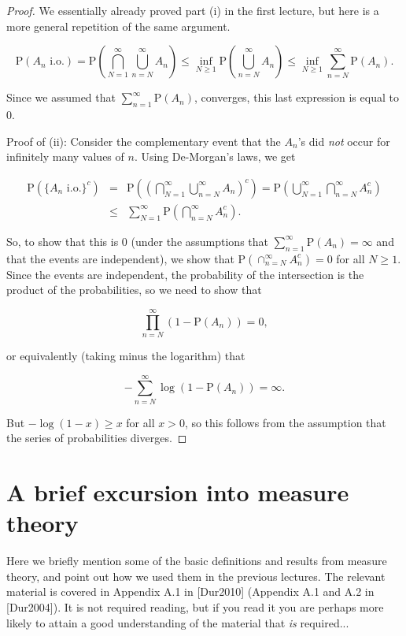 \documentclass[11pt]{report}
\theoremstyle{plain}
\theoremstyle{definition}
\begin{document}
\begin{proof}
We essentially already proved part (i) in the first
lecture, but here is a more general repetition of the
same argument.

\[
\mathrm{P}(A_n\textrm{ i.o.}) = \mathrm{P}\left(\bigcap_{N=1}^\infty \bigcup_{n=N}^\infty A_n \right)
\le \inf_{N\ge1} \mathrm{P}\left( \bigcup_{n=N}^\infty A_n\right) \le
\inf_{N\ge 1} \sum_{n=N}^\infty \mathrm{P}(A_n).
\]

\noindent Since we assumed that
$\sum_{n=1}^\infty \mathrm{P}(A_n)$, converges, this
last expression is equal to $0$.

Proof of (ii): Consider the complementary event that
the $A_n$'s did \emph{not} occur for infinitely many
values of $n$. Using De-Morgan's laws, we get

\begin{eqnarray*}
\mathrm{P}(\{A_n\textrm{ i.o.}\}^c) &=& \mathrm{P}\left(\left(\bigcap_{N=1}^\infty \bigcup_{n=N}^\infty A_n\right)^c \right) = \mathrm{P}\left( \bigcup_{N=1}^\infty \bigcap_{n=N}^\infty A_n^c \right) \\
&\le &\sum_{N=1}^\infty \mathrm{P}\left( \bigcap_{n=N}^\infty A_n^c \right).
\end{eqnarray*}

\noindent So, to show that this is 0 (under the assumptions
that $\sum_{n=1}^\infty \mathrm{P}(A_n) = \infty$ and
that the events are independent), we show that
$\mathrm{P}\left( \cap_{n=N}^\infty A_n^c \right) =
0$
for all $N\ge 1$. Since the events are independent,
the probability of the intersection is the product of
the probabilities, so we need to show that

\[
\prod_{n=N}^\infty (1-\mathrm{P}(A_n)) = 0,
\]

\noindent or equivalently (taking minus the logarithm) that

\[
-\sum_{n=N}^\infty \log(1-\mathrm{P}(A_n)) = \infty.
\]

\noindent But $-\log(1-x) \ge x$ for all $x>0$, so this follows
from the assumption that the series of probabilities
diverges.
\end{proof}

\chapter{A brief excursion into measure theory}

Here we briefly mention some of the basic definitions
and results from measure theory, and point out how we
used them in the previous lectures. The relevant
material is covered in Appendix A.1 in [Dur2010]
(Appendix A.1 and A.2 in [Dur2004]). It is not
required reading, but if you read it you are perhaps
more likely to attain a good understanding of the
material that \emph{is} required...
\end{document}
